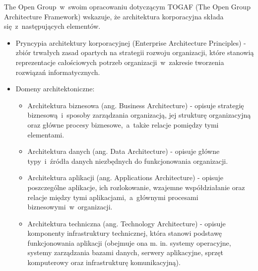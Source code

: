 The Open Group~w~swoim opracowaniu dotyczącym TOGAF (The Open Group Architecture Framework) wskazuje, że architektura korporacyjna składa się~z~następujących elementów.
\begin{itemize}
\item{Pryncypia architektury korporacyjnej (Enterprise Architecture Principles) - zbiór trwałych zasad opartych na strategii rozwoju organizacji, które stanowią reprezentacje całościowych potrzeb organizacji~w~zakresie tworzenia rozwiązań informatycznych.}
\item{Domeny architektoniczne:
\begin{itemize}
\item{Architektura biznesowa (ang. Business Architecture) - opisuje strategię biznesową~i~sposoby zarządzania organizacją, jej strukturę organizacyjną oraz główne procesy biznesowe,~a~także relacje pomiędzy tymi elementami.}
\item{Architektura danych (ang. Data Architecture) - opisuje główne typy~i~źródła danych niezbędnych do funkcjonowania organizacji.}
\item{Architektura aplikacji (ang. Applications Architecture) - opisuje poszczególne aplikacje, ich rozlokowanie, wzajemne współdziałanie oraz relacje między tymi aplikacjami,~a~głównymi procesami biznesowymi~w~organizacji.}
\item{Architektura techniczna (ang. Technology Architecture) - opisuje komponenty infrastruktury technicznej, która stanowi podstawę funkcjonowania aplikacji (obejmuje ona m. in. systemy operacyjne, systemy zarządzania bazami danych, serwery aplikacyjne, sprzęt komputerowy oraz infrastrukturę komunikacyjną).}
\end{itemize}
}
\end{itemize}

